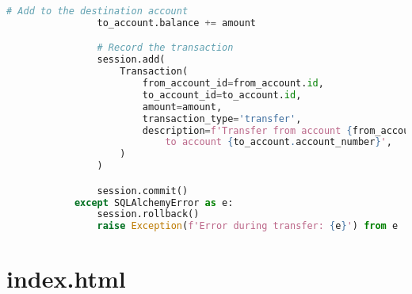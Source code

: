 \begin{lstlisting}[language=Python]
				# Add to the destination account
				to_account.balance += amount

				# Record the transaction
				session.add(
					Transaction(
						from_account_id=from_account.id,
						to_account_id=to_account.id,
						amount=amount,
						transaction_type='transfer',
						description=f'Transfer from account {from_account.account_number} \
							to account {to_account.account_number}',
					)
				)

				session.commit()
			except SQLAlchemyError as e:
				session.rollback()
				raise Exception(f'Error during transfer: {e}') from e
\end{lstlisting}

\section{index.html}
